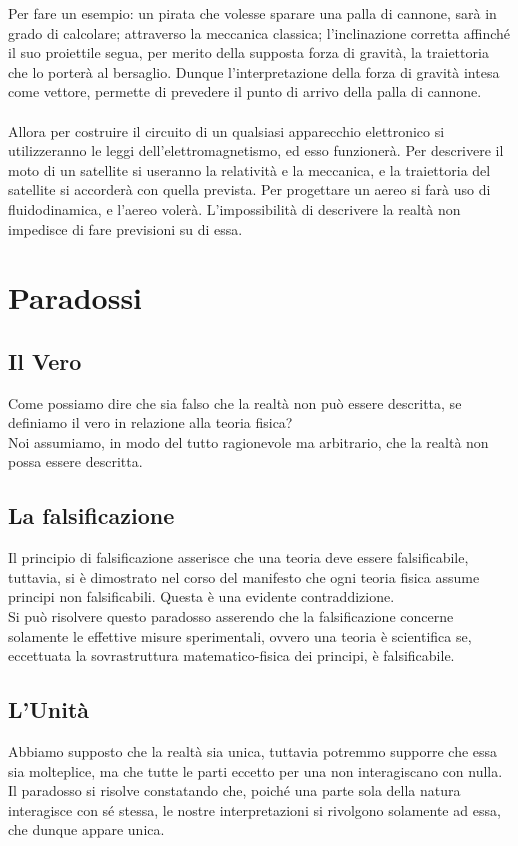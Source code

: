 \documentclass[]{article}
\begin{document}
	Per fare un esempio: un pirata che volesse sparare una palla di cannone, sarà in grado di calcolare; attraverso la meccanica classica; l'inclinazione corretta affinché il suo proiettile segua, per merito della supposta forza di gravità, la traiettoria che lo porterà al bersaglio. Dunque l'interpretazione della forza di gravità intesa come vettore, permette di prevedere il punto di arrivo della palla di cannone.   
	\\
	\\
	Allora per costruire il circuito di un qualsiasi apparecchio elettronico si utilizzeranno le leggi dell'elettromagnetismo, ed esso funzionerà. Per descrivere il moto di un satellite si useranno la relatività e la meccanica, e la traiettoria del satellite si accorderà con quella prevista. Per progettare un aereo si farà uso di fluidodinamica, e l'aereo volerà.  
	L'impossibilità di descrivere la realtà non impedisce di fare previsioni su di essa.
	\section{Paradossi}
	\subsection{Il Vero}
	Come possiamo dire che sia falso che la realtà non può essere descritta, se definiamo il vero in relazione alla teoria fisica?\\
	Noi assumiamo, in modo del tutto ragionevole ma arbitrario, che la realtà non possa essere descritta.
	\subsection{La falsificazione}
	Il principio di falsificazione asserisce che una teoria deve essere falsificabile, tuttavia, si è dimostrato nel corso del manifesto che ogni teoria fisica assume principi non falsificabili. Questa è una evidente contraddizione.\\
	Si può risolvere questo paradosso asserendo che la falsificazione concerne solamente le effettive misure sperimentali, ovvero una teoria è scientifica se, eccettuata la sovrastruttura matematico-fisica dei principi, è falsificabile.
	\subsection{L'Unità}
	Abbiamo supposto che la realtà sia unica, tuttavia potremmo supporre che essa sia molteplice, ma che tutte le parti eccetto per una non interagiscano con nulla.\\
	Il paradosso si risolve constatando che, poiché una parte sola della natura interagisce con sé stessa, le nostre interpretazioni si rivolgono solamente ad essa, che dunque appare unica.
\end{document}
